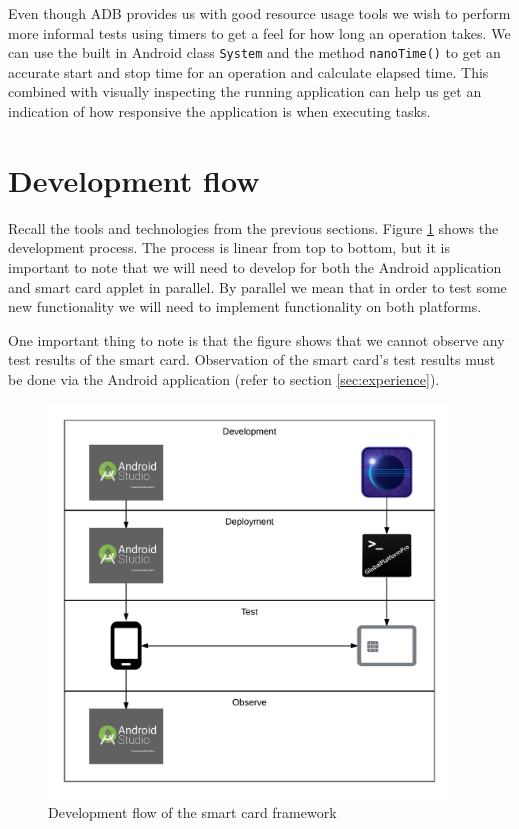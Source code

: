Even though ADB provides us with good resource usage tools we wish to perform more informal tests using timers to get a feel for how long an operation takes. We can use the built in Android class \texttt{System} and the method \texttt{nanoTime()} to get an accurate start and stop time for an operation and calculate elapsed time. This combined with visually inspecting the running application can help us get an indication of how responsive the application is when executing tasks.
\clearpage
\section{Development flow}
Recall the tools and technologies from the previous sections. Figure \ref{fig:devFlow} shows the development process. The process is linear from top to bottom, but it is important to note that we will need to develop for both the Android application and smart card applet in parallel. By parallel we mean that in order to test some new functionality we will need to implement functionality on both platforms.

One important thing to note is that the figure shows that we cannot observe any test results of the smart card. Observation of the smart card's test results must be done via the Android application (refer to section \ref{sec:experience}).

\begin{figure}[h!]
  \caption{Development flow of the smart card framework}
  \label{fig:devFlow}
  \centering
    \includegraphics[width=0.95\textwidth]{images/devFlow.png}
\end{figure}
